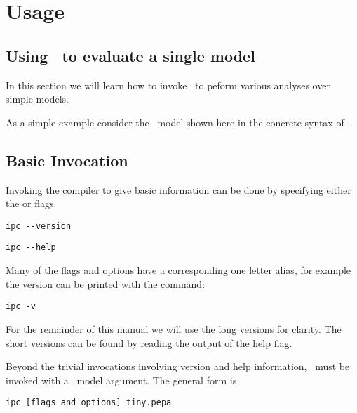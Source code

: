 \newcommand{\showcommandline}[1]{
\begin{commandline}
\$ ipc #1
\end{commandline}
}

\newcommand{\commandNameIpcSmc}{\ipc}

\clearpage

\section{Usage}



\subsection{Using \ipc\ to evaluate a single model}
In this section we will learn how to invoke \ipc\ to peform
various analyses over simple models. 

As a simple example consider the \pepa\ model shown here in
the concrete syntax of \ipc.


\subsection{Basic Invocation}
Invoking the compiler to give basic information can be done by
specifying either the  or  flags.
\begin{verbatim}
ipc --version
\end{verbatim}

\begin{verbatim}
ipc --help
\end{verbatim}

Many of the flags and options have a corresponding one letter alias,
for example the version can be printed with the command:
\begin{verbatim}
ipc -v
\end{verbatim}
For the remainder of this manual we will use the long versions for
clarity.  The short versions can be found by reading the output of the
help flag.

Beyond the trivial invocations involving version and help information,
\ipc\ must be invoked with a \pepa\ model argument.
The general form is
\begin{verbatim}
ipc [flags and options] tiny.pepa
\end{verbatim}

